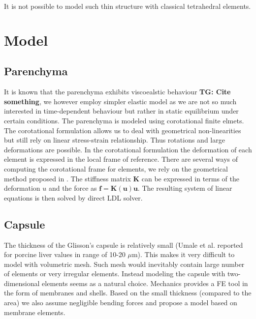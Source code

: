 \documentclass{llncs}
\newcommand{\TG}[1]{{\color{blue}\textbf{TG: #1}}}
\newcommand{\Vec}[1]{\mathbf{#1}}
\newcommand{\Mat}[1]{\mathbf{#1}}
\begin{document}
It is not possible to model such thin structure with classical tetrahedral
elements.






\section{Model}

\subsection{Parenchyma} %

It is known that the parenchyma exhibits viscoealstic behaviour \TG{Cite
something}, we however employ simpler elastic model as we are not so much
interested in time-dependent behaviour but rather in static equilibrium
under certain conditions.
%
The parenchyma is modeled using corotational finite elmets. The corotational
formulation allows us to deal with geometrical non-linearities but still
rely on linear stress-strain relationship. Thus rotations and large
deformations are possible. In the corotational formulation the deformation
of each element is expressed in the local frame of reference. There are
several ways of computing the corotational frame for elements, we rely on
the geometrical method proposed in \cite{Nesme2005}.
The stiffness matrix $\Mat{K}$ can be expressed in terms of the deformation
$u$ and the force as $\Vec{f} = \Mat{K}(\Vec{u}) \Vec{u}$. The resulting
system of linear equations is then solved by direct LDL solver.


\subsection{Capsule} %

The thickness of the Glisson's capsule is relatively small (Umale et al.
\cite{Umale2011} reported for porcine liver values in range of 10-20
$\mu$m). This makes it very difficult to model with volumetric mesh. Such
mesh would inevitably contain large number of elements or very irregular
elements. Instead modeling the capsule with two-dimensional elements seems
as a natural choice. Mechanics provides a FE tool in the form of membranes
and shells. Based on the small thickness (compared to the area) we also
assume negligible bending forces and propose a model based on membrane
elements. 
\end{document}
